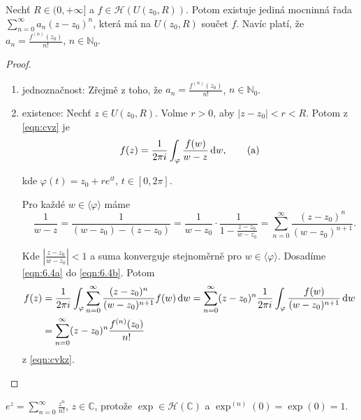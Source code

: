 \begin{theorem}
Nechť $R \in (0, +\infty]$ a $f \in \mathcal{H}(U(z_0,R))$. Potom existuje jediná mocninná řada $\sum\limits _{n=0} ^{\infty} a_n(z-z_0)^n$, která má na $U(z_0,R)$ součet $f$. Navíc platí, že $a_n=\frac{f^{(n)}(z_0)}{n!}$, $n \in \mathbb{N}_0$.
\end{theorem}

\begin{proof}
\begin{enumerate}
    \item jednoznačnost: Zřejmě z toho, že $a_n=\frac{f^{(n)}(z_0)}{n!}$, $n \in \mathbb{N}_0$.
    \item existence: Nechť $z \in U(z_0, R)$. Volme $r>0$, aby $|z-z_0|<r<R$. Potom z \cref{eqn:cvz} je
    \begin{equation}
        f(z)=\frac{1}{2 \pi i} \int_\varphi \frac{f(w)}{w-z} \mathop{}\!\mathrm{d} w,
        \tag{a}
        \label{eqn:6.4a}
    \end{equation}
    
    kde $\varphi(t)=z_0+re^{it} \text{, } t \in [0, 2\pi]$.
    
    Pro každé $w \in \langle \varphi \rangle$ máme
    \begin{equation}
        \quad \frac{1}{w-z}=\frac{1}{(w-z_0)-(z-z_0)}=\frac{1}{w-z_0}\cdot\frac{1}{1-\frac{z-z_0}{w-z_0}}=\sum_{n=0}^\infty \frac{(z-z_0)^n}{(w-z_0)^{n+1}} \text{.}    
        \label{eqn:6.4b}
        \tag{b}
    \end{equation}
    
    Kde $|\frac{z-z_0}{w-z_0}|<1$ a suma konverguje stejnoměrně pro $w \in  \langle \varphi \rangle$. Dosadíme \cref{eqn:6.4a} do \cref{eqn:6.4b}. Potom
    \begin{equation*}
        \begin{split}
    f(z) &=\frac{1}{2 \pi i} \int_\varphi \sum_{n=0}^\infty \frac{(z-z_0)^n}{(w-z_0)^{n+1}} f(w) \mathop{}\!\mathrm{d} w= 
    \sum_{n=0}^\infty (z-z_0)^n \frac{1}{2 \pi i} \int_\varphi \frac{f(w)}{(w-z_0)^{n+1}} \mathop{}\!\mathrm{d} w \\
     &=\sum_{n=0}^\infty (z-z_0)^n \frac{f^{(n)}(z_0)}{n!}
     \end{split}
    \end{equation*}
    z \cref{eqn:cvkz}.
\end{enumerate}
\end{proof}

\begin{example}
$e^z=\sum\limits_{n=0}^\infty \frac{z^n}{n!}$, $z \in \mathbb{C}$, protože $\exp \in \mathcal{H}(\mathbb{C})$ a $\exp^{(n)}(0)=\exp(0)=1$.
\end{example}

